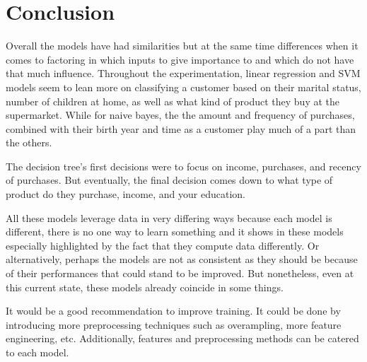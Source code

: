 \section{Conclusion}

Overall the models have had similarities but at the same time differences when it comes to factoring in which inputs to give importance to and which do not have that much influence. Throughout the experimentation, linear regression and SVM models seem to lean more on classifying a customer based on their marital status, number of children at home, as well as what kind of product they buy at the supermarket. While for naive bayes, the the amount and frequency of purchases, combined with their birth year and time as a customer play much of a part than the others.

The decision tree's first decisions were to focus on income, purchases, and recency of purchases. But eventually, the final decision comes down to what type of product do they purchase, income, and your education. 

All these models leverage data in very differing ways because each model is different, there is no one way to learn something and it shows in these models especially highlighted by the fact that they compute data differently. Or alternatively, perhaps the models are not as consistent as they should be because of their performances that could stand to be improved. But nonetheless, even at this current state, these models already coincide in some things.

It would be a good recommendation to improve training. It could be done by introducing more preprocessing techniques such as overampling, more feature engineering, etc. Additionally, features and preprocessing methods can be catered to each model.
